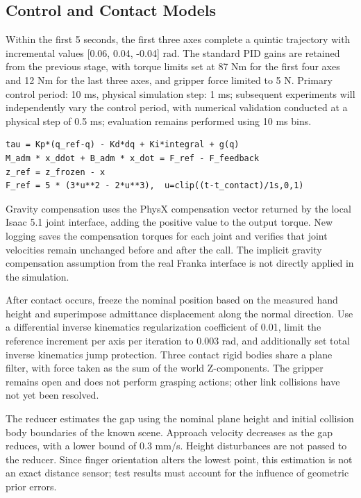 \subsection{Control and Contact Models}\label{s13-detail-2}

Within the first 5 seconds, the first three axes complete a quintic trajectory with incremental values {[}0.06, 0.04, -0.04{]} rad. The standard PID gains are retained from the previous stage, with torque limits set at 87 Nm for the first four axes and 12 Nm for the last three axes, and gripper force limited to 5 N. Primary control period: 10 ms, physical simulation step: 1 ms; subsequent experiments will independently vary the control period, with numerical validation conducted at a physical step of 0.5 ms; evaluation remains performed using 10 ms bins.

\begin{Verbatim}[breaklines=true,breakanywhere=true,fontsize=\footnotesize]
tau = Kp*(q_ref-q) - Kd*dq + Ki*integral + g(q)
M_adm * x_ddot + B_adm * x_dot = F_ref - F_feedback
z_ref = z_frozen - x
F_ref = 5 * (3*u**2 - 2*u**3),  u=clip((t-t_contact)/1s,0,1)
\end{Verbatim}

Gravity compensation uses the PhysX compensation vector returned by the local Isaac 5.1 joint interface, adding the positive value to the output torque. New logging saves the compensation torques for each joint and verifies that joint velocities remain unchanged before and after the call. The implicit gravity compensation assumption from the real Franka interface is not directly applied in the simulation.

After contact occurs, freeze the nominal position based on the measured hand height and superimpose admittance displacement along the normal direction. Use a differential inverse kinematics regularization coefficient of 0.01, limit the reference increment per axis per iteration to 0.003 rad, and additionally set total inverse kinematics jump protection. Three contact rigid bodies share a plane filter, with force taken as the sum of the world Z-components. The gripper remains open and does not perform grasping actions; other link collisions have not yet been resolved.

The reducer estimates the gap using the nominal plane height and initial collision body boundaries of the known scene. Approach velocity decreases as the gap reduces, with a lower bound of 0.3 mm/s. Height disturbances are not passed to the reducer. Since finger orientation alters the lowest point, this estimation is not an exact distance sensor; test results must account for the influence of geometric prior errors.

